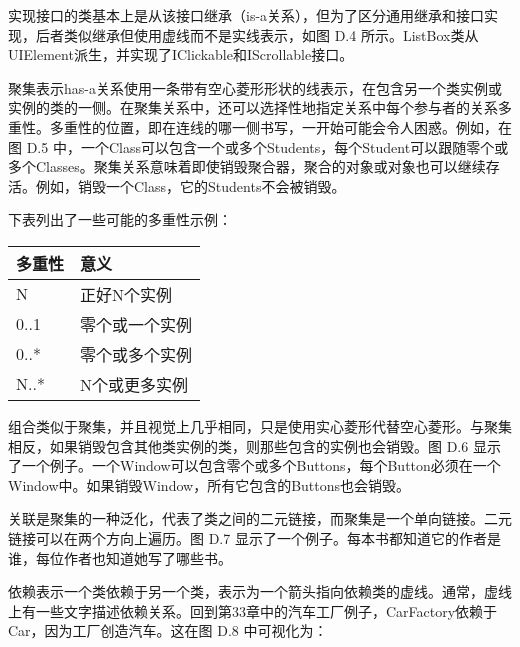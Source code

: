 

实现接口的类基本上是从该接口继承（is-a关系），但为了区分通用继承和接口实现，后者类似继承但使用虚线而不是实线表示，如图 D.4 所示。ListBox类从UIElement派生，并实现了IClickable和IScrollable接口。



聚集表示has-a关系使用一条带有空心菱形形状的线表示，在包含另一个类实例或实例的类的一侧。在聚集关系中，还可以选择性地指定关系中每个参与者的关系多重性。多重性的位置，即在连线的哪一侧书写，一开始可能会令人困惑。例如，在图 D.5 中，一个Class可以包含一个或多个Students，每个Student可以跟随零个或多个Classes。聚集关系意味着即使销毁聚合器，聚合的对象或对象也可以继续存活。例如，销毁一个Class，它的Students不会被销毁。


下表列出了一些可能的多重性示例：

\begin{longtable}{|l|l|}
\hline
\textbf{多重性} & \textbf{意义}       \\ \hline
\endfirsthead
%
\endhead
%
N                     & 正好N个实例    \\ \hline
0..1                  & 零个或一个实例   \\ \hline
0..*                  & 零个或多个实例 \\ \hline
N..*                  & N个或更多实例    \\ \hline
\end{longtable}


组合类似于聚集，并且视觉上几乎相同，只是使用实心菱形代替空心菱形。与聚集相反，如果销毁包含其他类实例的类，则那些包含的实例也会销毁。图 D.6 显示了一个例子。一个Window可以包含零个或多个Buttons，每个Button必须在一个Window中。如果销毁Window，所有它包含的Buttons也会销毁。



关联是聚集的一种泛化，代表了类之间的二元链接，而聚集是一个单向链接。二元链接可以在两个方向上遍历。图 D.7 显示了一个例子。每本书都知道它的作者是谁，每位作者也知道她写了哪些书。



依赖表示一个类依赖于另一个类，表示为一个箭头指向依赖类的虚线。通常，虚线上有一些文字描述依赖关系。回到第33章中的汽车工厂例子，CarFactory依赖于Car，因为工厂创造汽车。这在图 D.8 中可视化为：


